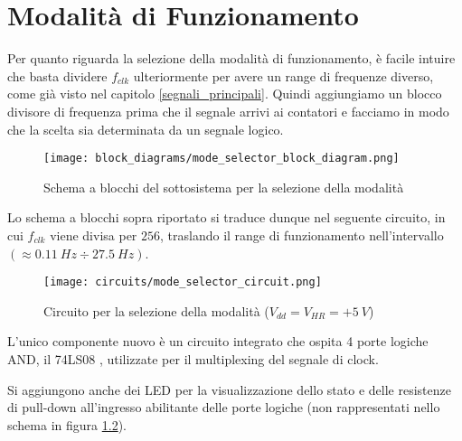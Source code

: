 \chapter{Modalità di Funzionamento}


Per quanto riguarda la selezione della modalità di funzionamento, è facile intuire che basta
dividere $f_{clk}$ ulteriormente per avere un range di frequenze diverso, come già visto nel
capitolo \ref{segnali_principali}. Quindi aggiungiamo un blocco divisore di frequenza prima
che il segnale arrivi ai contatori e facciamo in modo che la scelta sia determinata da un
segnale logico.

\begin{figure}[H]
    \centering
    \texttt{[image: block\_diagrams/mode\_selector\_block\_diagram.png]}
    \caption{Schema a blocchi del sottosistema per la selezione della modalità}
    \label{mode_selector_block_diagram}
\end{figure}

Lo schema a blocchi sopra riportato si traduce dunque nel seguente circuito, in cui $f_{clk}$
viene divisa per $256$, traslando il range di funzionamento nell'intervallo
$(\approx0.11\ Hz\div27.5\ Hz)$.

\begin{figure}[H]
    \centering
    \texttt{[image: circuits/mode\_selector\_circuit.png]}
    \caption{Circuito per la selezione della modalità ($V_{dd}=V_{HR}=+5\ V$)}
    \label{mode_selector_circuit}
\end{figure}

L'unico componente nuovo è un circuito integrato che ospita 4 porte logiche AND, il 74LS08
\cite{74ls08}, utilizzate per il multiplexing del segnale di clock.

Si aggiungono anche dei LED per la visualizzazione dello stato e delle resistenze di pull-down
all'ingresso abilitante delle porte logiche (non rappresentati nello schema in figura
\ref{mode_selector_circuit}).

